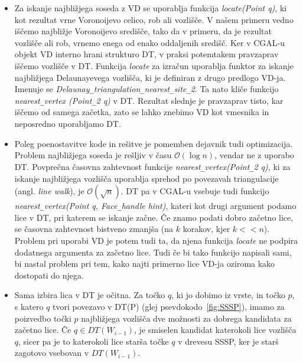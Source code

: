 \documentclass[a4paper, 12pt]{book}
\newcommand{\OO}{\ensuremath{\mathcal{O}}} %
\newcommand{\U}{\texttt{\_}}
\begin{document}
\begin{itemize}
\item Za iskanje najbližjega soseda z VD se uporablja funkcija \textit{locate(Point q)}, ki kot rezultat vrne Voronoijevo celico, rob ali vozlišče. V našem primeru vedno iščemo najbližje Voronoijevo središče, tako da v primeru, da je rezultat vozlišče ali rob, vrnemo enega od enako oddaljenih središč. Ker v CGAL-u objekt VD interno hrani strukturo DT, v praksi potemtakem pravzaprav iščemo vozlišče v DT. Funkcija \textit{locate} za izračun uporablja funktor za iskanje najbližjega Delaunayevega vozlišča, ki je definiran z drugo predlogo VD-ja. Imenuje se \textit{Delaunay\U triangulation\U nearest\U site\U 2}. Ta nato kliče funkcijo \textit{nearest\U vertex (Point\U 2 q)} v DT. Rezultat slednje je pravzaprav tisto, kar iščemo od samega začetka, zato se lahko znebimo VD kot vmesnika in neposredno uporabljamo DT.
\item Poleg poenostavitve kode in rešitve je pomemben dejavnik tudi optimizacija. Problem najbližjega soseda je rešljiv v času $\OO(\log n)$, vendar ne z uporabo DT. Povprečna časovna zahtevnost funkcije \textit{nearest\U vertex(Point\U 2 q)}, ki za iskanje najbližjega vozlišča uporablja sprehod po povezavah triangulacije (angl. \textit{line walk}), je $\OO(\sqrt{n})$. DT pa v CGAL-u vsebuje tudi funkcijo \textit{nearest\U vertex(Point q, Face\U handle hint)}, kateri kot drugi argument podamo lice v DT, pri katerem se iskanje začne. Če znamo podati dobro začetno lice, se časovna zahtevnost bistveno zmanjša (na $k$ korakov, kjer $k << n$). Problem pri uporabi VD je potem tudi ta, da njena funkcija \textit{locate} ne podpira dodatnega argumenta za začetno lice. Tudi če bi tako funkcijo napisali sami, bi nastal problem pri tem, kako najti primerno lice VD-ja oziroma kako dostopati do njega. 
\item Sama izbira lica v DT je očitna. Za točko $q$, ki jo dobimo iz vrste, in točko $p$, s katero $q$ tvori povezavo v DT(P) (glej psevdokodo~\ref{fig:SSSP}), imamo za poizvedbo točki $p$ najbližjega vozlišča dve možnosti za dobrega kandidata za začetno lice. Če $q\in DT(W_{i-1})$, je smiselen kandidat katerokoli lice vozlišča $q$, sicer pa je to katerokoli lice starša točke $q$ v drevesu SSSP, ker je starš zagotovo vsebovan v $DT(W_{i-1})$. 
\end{itemize}
\end{document}
